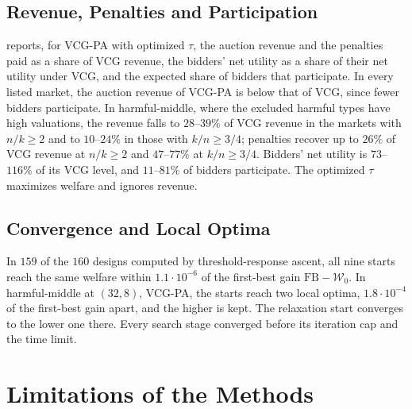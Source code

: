 \documentclass[11pt]{article}
\newcommand{\W}{\mathcal{W}}
\newcommand{\FB}{\mathrm{FB}}
\begin{document}
\subsection{Revenue, Penalties and Participation}\label{sec:revenue}

 reports, for VCG-PA with optimized $\tau$, the auction revenue and the penalties paid as a share of VCG revenue, the bidders' net utility as a share of their net utility under VCG, and the expected share of bidders that participate. In every listed market, the auction revenue of VCG-PA is below that of VCG, since fewer bidders participate. In harmful-middle, where the excluded harmful types have high valuations, the revenue falls to $28$--$39\%$ of VCG revenue in the markets with $n/k\geq2$ and to $10$--$24\%$ in those with $k/n\geq3/4$; penalties recover up to $26\%$ of VCG revenue at $n/k\geq2$ and $47$--$77\%$ at $k/n\geq3/4$. Bidders' net utility is $73$--$116\%$ of its VCG level, and $11$--$81\%$ of bidders participate. The optimized $\tau$ maximizes welfare and ignores revenue.

\begin{table}[htbp]
\centering\footnotesize

\caption{VCG-PA with optimized $\tau$ in eight markets of each distribution: VCG revenue (level); auction revenue, penalties paid, and their sum, in percent of VCG revenue; bidders' net utility in percent of its VCG level; participants in percent of $n$. Exact.}
\label{tab:money}
\end{table}

\subsection{Convergence and Local Optima}\label{sec:local}

In $159$ of the $160$ designs computed by threshold-response ascent, all nine starts reach the same welfare within $1.1\cdot10^{-6}$ of the first-best gain $\FB-\W_0$. In harmful-middle at $(32,8)$, VCG-PA, the starts reach two local optima, $1.8\cdot10^{-4}$ of the first-best gain apart, and the higher is kept. The relaxation start converges to the lower one there. Every search stage converged before its iteration cap and the time limit.

\section{Limitations of the Methods}\label{sec:limitations}
\end{document}
